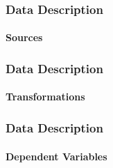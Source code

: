 
\begin{frame}
    \frametitle{Data Description}
    \framesubtitle{Sources}

    \lipsum[1]

\end{frame}

\begin{frame}
    \frametitle{Data Description}
    \framesubtitle{Transformations}

    \lipsum[1]

\end{frame}


\begin{frame}
    \frametitle{Data Description}
    \framesubtitle{Dependent Variables}

    \lipsum[1]
\end{frame}
